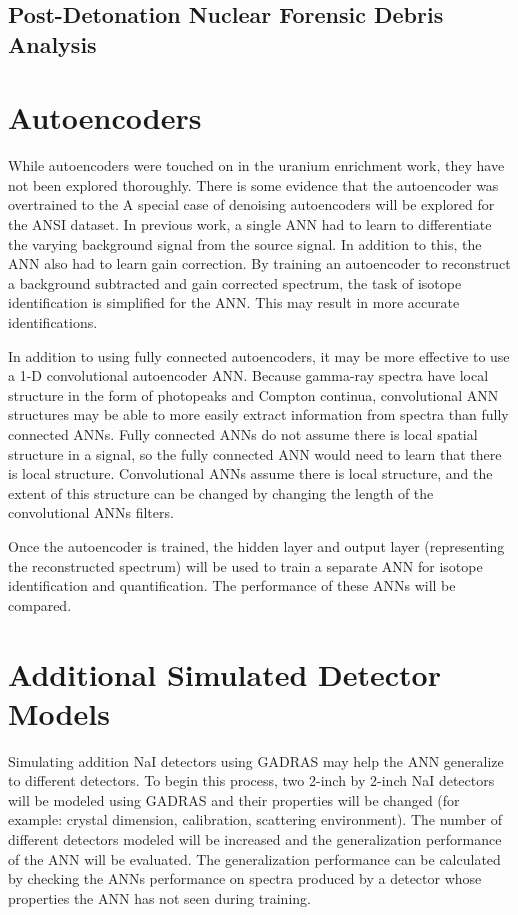 \documentclass[thesis,tocnosub,noragright,centerchapter,12pt,fullpage]{uiucecethesis09}
\begin{document}
\subsection{Post-Detonation Nuclear Forensic Debris Analysis}



\section{Autoencoders}

While autoencoders were touched on in the uranium enrichment work, they have not been explored thoroughly. There is some evidence that the autoencoder was overtrained to the 
A special case of denoising autoencoders will be explored for the ANSI dataset. In previous work, a single ANN had to learn to differentiate the varying background signal from the source signal. In addition to this, the ANN also had to learn gain correction. By training an autoencoder to reconstruct a background subtracted and gain corrected spectrum, the task of isotope identification is simplified for the ANN. This may result in more accurate identifications. 

In addition to using fully connected autoencoders, it may be more effective to use a 1-D convolutional autoencoder ANN. Because gamma-ray spectra have local structure in the form of photopeaks and Compton continua, convolutional ANN structures may be able to more easily extract information from spectra than fully connected ANNs. Fully connected ANNs do not assume there is local spatial structure in a signal, so the fully connected ANN would need to learn that there is local structure. Convolutional ANNs assume there is local structure, and the extent of this structure can be changed by changing the length of the convolutional ANNs filters.

Once the autoencoder is trained, the hidden layer and output layer (representing the reconstructed spectrum) will be used to train a separate ANN for isotope identification and quantification. The performance of these ANNs will be compared.

\section{Additional Simulated Detector Models}

Simulating addition NaI detectors using GADRAS may help the ANN generalize to different detectors. To begin this process, two 2-inch by 2-inch NaI detectors will be modeled using GADRAS and their properties will be changed (for example: crystal dimension, calibration, scattering environment). The number of different detectors modeled will be increased and the generalization performance of the ANN will be evaluated. The generalization performance can be calculated by checking the ANNs performance on spectra produced by a detector whose properties the ANN has not seen during training.  
\end{document}
